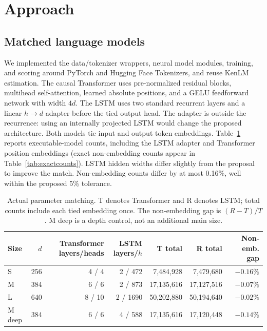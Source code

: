 \documentclass[10pt]{article}
\begin{document}
\section{Approach}

\subsection{Matched language models}

We implemented the data/tokenizer wrappers, neural model modules, training, and scoring around PyTorch and Hugging Face Tokenizers, and reuse KenLM estimation. The causal Transformer uses pre-normalized residual blocks, multihead self-attention, learned absolute positions, and a GELU feedforward network with width $4d$. The LSTM uses two standard recurrent layers and a linear $h\!\rightarrow\!d$ adapter before the tied output head. The adapter is outside the recurrence: using an internally projected LSTM would change the proposed architecture. Both models tie input and output token embeddings. Table~\ref{tab:parameters} reports executable-model counts, including the LSTM adapter and Transformer position embeddings (exact non-embedding counts appear in Table~\ref{tab:exactcounts}). LSTM hidden widths differ slightly from the proposal to improve the match. Non-embedding counts differ by at most 0.16\%, well within the proposed 5\% tolerance.

\begin{table}[t]
\centering
\small
\begin{tabular}{lrrrrrr}
\toprule
Size & $d$ & Transformer layers/heads & LSTM layers/$h$ & T total & R total & Non-emb. gap \\
\midrule
S & 256 & 4 / 4 & 2 / 472 & 7,484,928 & 7,479,680 & $-0.16\%$ \\
M & 384 & 6 / 6 & 2 / 873 & 17,135,616 & 17,127,516 & $-0.07\%$ \\
L & 640 & 8 / 10 & 2 / 1690 & 50,202,880 & 50,194,640 & $-0.02\%$ \\
M deep & 384 & 6 / 6 & 4 / 588 & 17,135,616 & 17,120,448 & $-0.14\%$ \\
\bottomrule
\end{tabular}
\caption{Actual parameter matching. T denotes Transformer and R denotes LSTM; total counts include each tied embedding once. The non-embedding gap is $(R-T)/T$. M deep is a depth control, not an additional main size.}
\label{tab:parameters}
\end{table}
\end{document}
